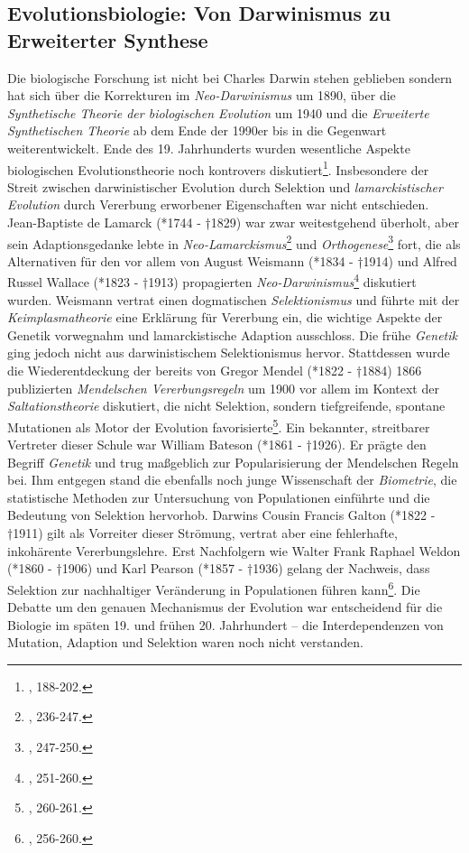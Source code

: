 \documentclass[openany,twoside,twocolumn]{book}
\let\rmarkdownfootnote\footnote%
\def\footnote{\protect\rmarkdownfootnote}
\begin{document}
\hypertarget{biology}{%
\subsection{Evolutionsbiologie: Von Darwinismus zu Erweiterter
Synthese}\label{biology}}

Die biologische Forschung ist nicht bei Charles Darwin stehen geblieben
sondern hat sich über die Korrekturen im \emph{Neo-Darwinismus} um 1890,
über die \emph{Synthetische Theorie der biologischen Evolution} um 1940
und die \emph{Erweiterte Synthetischen Theorie} ab dem Ende der 1990er
bis in die Gegenwart weiterentwickelt. Ende des 19. Jahrhunderts wurden
wesentliche Aspekte biologischen Evolutionstheorie noch kontrovers
diskutiert\footnote{\textcite{bowler_evolution_1989}, 188-202.}.
Insbesondere der Streit zwischen darwinistischer Evolution durch
Selektion und \emph{lamarckistischer Evolution} durch Vererbung
erworbener Eigenschaften war nicht entschieden. Jean-Baptiste de Lamarck
(*1744 - †1829) war zwar weitestgehend überholt, aber sein
Adaptionsgedanke lebte in \emph{Neo-Lamarckismus}\footnote{\textcite{bowler_evolution_1989},
  236-247.} und \emph{Orthogenese}\footnote{\textcite{bowler_evolution_1989},
  247-250.} fort, die als Alternativen für den vor allem von August
Weismann (*1834 - †1914) und Alfred Russel Wallace (*1823 - †1913)
propagierten \emph{Neo-Darwinismus}\footnote{\textcite{bowler_evolution_1989},
  251-260.} diskutiert wurden. Weismann vertrat einen dogmatischen
\emph{Selektionismus} und führte mit der \emph{Keimplasmatheorie} eine
Erklärung für Vererbung ein, die wichtige Aspekte der Genetik vorwegnahm
und lamarckistische Adaption ausschloss. Die frühe \emph{Genetik} ging
jedoch nicht aus darwinistischem Selektionismus hervor. Stattdessen
wurde die Wiederentdeckung der bereits von Gregor Mendel (*1822 - †1884)
1866 publizierten \emph{Mendelschen Vererbungsregeln} um 1900 vor allem
im Kontext der \emph{Saltationstheorie} diskutiert, die nicht Selektion,
sondern tiefgreifende, spontane Mutationen als Motor der Evolution
favorisierte\footnote{\textcite{bowler_evolution_1989}, 260-261.}. Ein
bekannter, streitbarer Vertreter dieser Schule war William Bateson
(*1861 - †1926). Er prägte den Begriff \emph{Genetik} und trug
maßgeblich zur Popularisierung der Mendelschen Regeln bei. Ihm entgegen
stand die ebenfalls noch junge Wissenschaft der \emph{Biometrie}, die
statistische Methoden zur Untersuchung von Populationen einführte und
die Bedeutung von Selektion hervorhob. Darwins Cousin Francis Galton
(*1822 - †1911) gilt als Vorreiter dieser Strömung, vertrat aber eine
fehlerhafte, inkohärente Vererbungslehre. Erst Nachfolgern wie Walter
Frank Raphael Weldon (*1860 - †1906) und Karl Pearson (*1857 - †1936)
gelang der Nachweis, dass Selektion zur nachhaltiger Veränderung in
Populationen führen kann\footnote{\textcite{bowler_evolution_1989},
  256-260.}. Die Debatte um den genauen Mechanismus der Evolution war
entscheidend für die Biologie im späten 19. und frühen 20. Jahrhundert
-- die Interdependenzen von Mutation, Adaption und Selektion waren noch
nicht verstanden.
\end{document}

